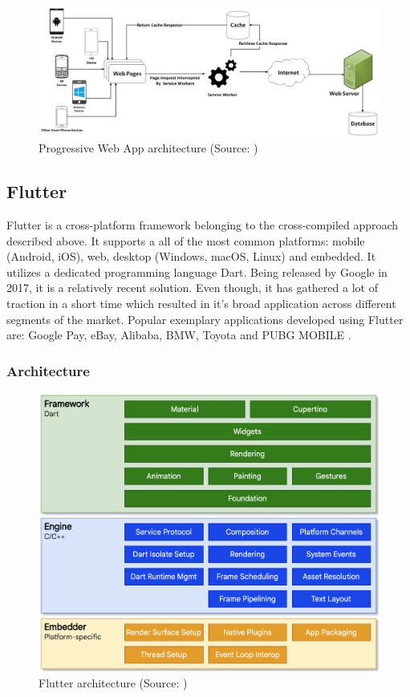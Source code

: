 \begin{figure}[h]
	\centering
	\includegraphics[width=\textwidth]{img/pwa}
	\caption{Progressive Web App architecture (Source: \cite{dawning_pwa})}
	\label{fig:pwa_architecture}
\end{figure}

\subsection{Flutter}
Flutter is a cross-platform framework belonging to the cross-compiled approach described above. It supports a all of the most common platforms: mobile (Android, iOS), web, desktop (Windows, macOS, Linux) and embedded. It utilizes a dedicated programming language Dart. Being released by Google in 2017, it is a relatively recent solution. Even though, it has gathered a lot of traction in a short time which resulted in it's broad application across different segments of the market. Popular exemplary applications developed using Flutter are: Google Pay, eBay, Alibaba, BMW, Toyota and PUBG MOBILE \cite{flutter_showcase,flutter_docs_architecture}.

\subsubsection*{Architecture}

\begin{figure}[h]
	\centering
	\includegraphics[width=.77\textwidth]{img/flutter_architecture}
	\caption{Flutter architecture (Source: \cite{flutter_docs_architecture})}
	\label{fig:flutter_architecture}
\end{figure}


